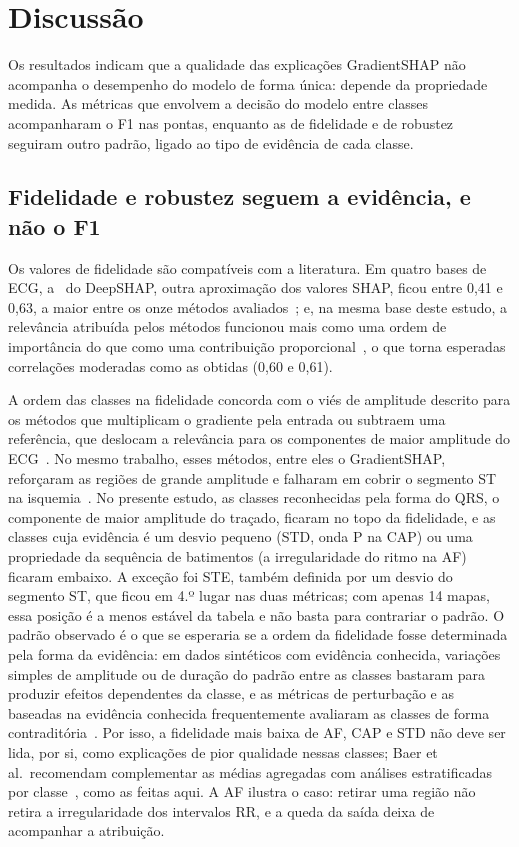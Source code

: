 \section{Discussão}\label{sec:discussao}

Os resultados indicam que a qualidade das explicações GradientSHAP não acompanha o desempenho do modelo de forma única: depende da propriedade medida. As métricas que envolvem a decisão do modelo entre classes acompanharam o F1 nas pontas, enquanto as de fidelidade e de robustez seguiram outro padrão, ligado ao tipo de evidência de cada classe.

\subsection{Fidelidade e robustez seguem a evidência, e não o F1}
Os valores de fidelidade são compatíveis com a literatura. Em quatro bases de ECG, a \FC\ do DeepSHAP, outra aproximação dos valores SHAP, ficou entre 0,41 e 0,63, a maior entre os onze métodos avaliados~\cite{suh2024}; e, na mesma base deste estudo, a relevância atribuída pelos métodos funcionou mais como uma ordem de importância do que como uma contribuição proporcional~\cite{turbe2023}, o que torna esperadas correlações moderadas como as obtidas (0,60 e 0,61).

A ordem das classes na fidelidade concorda com o viés de amplitude descrito para os métodos que multiplicam o gradiente pela entrada ou subtraem uma referência, que deslocam a relevância para os componentes de maior amplitude do ECG~\cite{gumpfer2026}. No mesmo trabalho, esses métodos, entre eles o GradientSHAP, reforçaram as regiões de grande amplitude e falharam em cobrir o segmento ST na isquemia~\cite{gumpfer2026}. No presente estudo, as classes reconhecidas pela forma do QRS, o componente de maior amplitude do traçado, ficaram no topo da fidelidade, e as classes cuja evidência é um desvio pequeno (STD, onda P na CAP) ou uma propriedade da sequência de batimentos (a irregularidade do ritmo na AF) ficaram embaixo. A exceção foi STE, também definida por um desvio do segmento ST, que ficou em 4.º lugar nas duas métricas; com apenas 14 mapas, essa posição é a menos estável da tabela e não basta para contrariar o padrão. O padrão observado é o que se esperaria se a ordem da fidelidade fosse determinada pela forma da evidência: em dados sintéticos com evidência conhecida, variações simples de amplitude ou de duração do padrão entre as classes bastaram para produzir efeitos dependentes da classe, e as métricas de perturbação e as baseadas na evidência conhecida frequentemente avaliaram as classes de forma contraditória~\cite{baer2025b}. Por isso, a fidelidade mais baixa de AF, CAP e STD não deve ser lida, por si, como explicações de pior qualidade nessas classes; Baer et al.\ recomendam complementar as médias agregadas com análises estratificadas por classe~\cite{baer2025a}, como as feitas aqui. A AF ilustra o caso: retirar uma região não retira a irregularidade dos intervalos RR, e a queda da saída deixa de acompanhar a atribuição.

